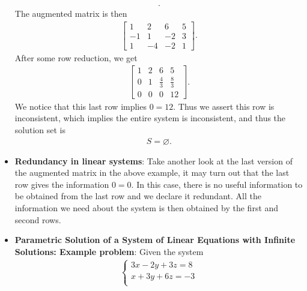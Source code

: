 \documentclass{report}
\begin{document}
\begin{itemize}
\begin{align*}
                .\end{align*}
                The augmented matrix is then
                \begin{align*}
                    \left[
                        \begin{array}{ccc|c}
                            1 &2 & 6 & 5 \\
                            -1 & 1 & -2 & 3 \\
                            1 & -4 & -2 & 1
                        \end{array}\right]
                .\end{align*}
                After some row reduction, we get
                \begin{align*}
                    \left[
                        \begin{array}{ccc|c}
                            1 & 2 & 6 & 5 \\
                            0 & 1 & \frac{4}{3} & \frac{8}{3} \\
                            0 & 0 & 0  &12
                        \end{array}
                    \right]
                .\end{align*}
                We notice that this last row implies $0=12$. Thus we assert this row is inconsistent, which implies the entire system is inconsistent, and thus the solution set is 
                \begin{align*}
                    S = \varnothing
                .\end{align*}
        \item \textbf{Redundancy in linear systems}: Take another look at the last version of the augmented matrix in the above example, it may turn out that the last row gives the information $0=0$. In this case, there is no useful information to be obtained from the last row and we declare it redundant. All the information we need about the system is then obtained by the first and second rows.
        \item \textbf{Parametric Solution of a System of Linear Equations with Infinite Solutions: Example problem}:
            \bigbreak \noindent 
            Given the system
            \begin{align*}
               \begin{cases}
                  3x -2y + 3z = 8 \\
                  x + 3y + 6z = -3 \\

\end{cases}
\end{align*}
\end{itemize}
\end{document}
